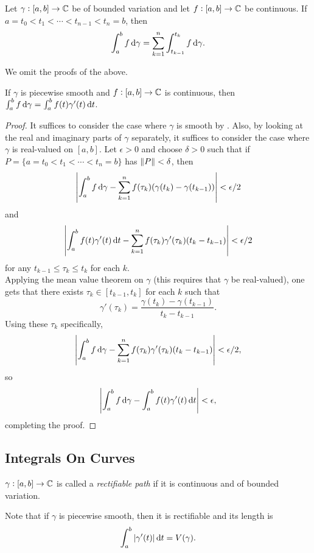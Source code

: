 		\begin{prop}
			\label{lemma: can split integral}
			Let $\gamma : [a,b] \to \mathbb{C}$ be of bounded variation and let $f : [a,b] \to \mathbb{C}$ be continuous. If $a = t_0 < t_1 < \cdots < t_{n-1} < t_n = b$, then
			\[ \int_a^b f \dif \gamma = \sum_{k=1}^n \int_{t_{k-1}}^{t_k} f \dif \gamma. \]
		\end{prop}

		We omit the proofs of the above.

		\begin{ftheo}
			If $\gamma$ is piecewise smooth and $f : [a,b] \to \mathbb{C}$ is continuous, then $\int_a^b f \dif \gamma = \int_a^b f(t) \gamma'(t) \dif t$.
		\end{ftheo}
		\begin{proof}
			It suffices to consider the case where $\gamma$ is smooth by . Also, by looking at the real and imaginary parts of $\gamma$ separately, it suffices to consider the case where $\gamma$ is real-valued on $[a,b]$. Let $\epsilon > 0$ and choose $\delta > 0$ such that if $P = \{ a = t_0 < t_1 < \cdots < t_n = b \}$ has $\left\lVert P\right\rVert < \delta$, then
			\[ \left| \int_a^b f \dif \gamma - \sum_{k=1}^n f(\tau_k) (\gamma(t_k) - \gamma(t_{k-1})) \right| < \epsilon/2 \]
			and
			\[ \left| \int_a^b f(t) \gamma'(t) \dif t - \sum_{k=1}^n f(\tau_k) \gamma'(\tau_k) (t_k - t_{k-1}) \right| < \epsilon/2 \]
			for any $t_{k-1} \le \tau_k \le t_k$ for each $k$.\\
			Applying the mean value theorem on $\gamma$ (this requires that $\gamma$ be real-valued), one gets that there exists $\tau_k \in [t_{k-1},t_k]$ for each $k$ such that
			\[ \gamma'(\tau_k) = \frac{\gamma(t_k) - \gamma(t_{k-1})}{t_k - t_{k-1}}. \]
			Using these $\tau_k$ specifically, 
			\[ \left| \int_a^b f \dif \gamma - \sum_{k=1}^n f(\tau_k) \gamma'(\tau_k) (t_k - t_{k-1}) \right| < \epsilon/2, \]
			so
			\[ \left| \int_a^b f \dif \gamma - \int_a^b f(t) \gamma'(t) \dif t \right| < \epsilon, \]
			completing the proof.
		\end{proof}

\subsection{Integrals On Curves}

	\begin{fdef}
		$\gamma:[a,b]\to\mathbb{C}$ is called a \emph{rectifiable path} if it is continuous and of bounded variation.
	\end{fdef}
	Note that if $\gamma$ is piecewise smooth, then it is rectifiable and its length is
	\[ \int_a^b |\gamma'(t)| \dif t = V(\gamma). \]

